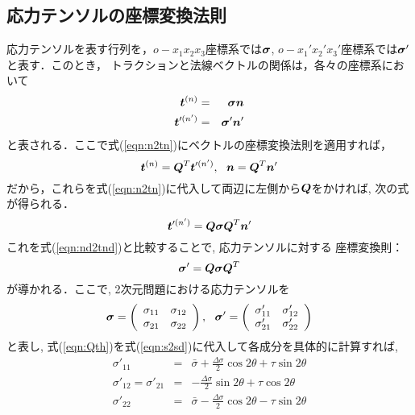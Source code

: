 \documentclass[10pt,a4j]{jbook}
\begin{document}
\subsection{応力テンソルの座標変換法則}
応力テンソルを表す行列を，$o-x_1x_2x_3$座標系では$\mbox{\boldmath $\sigma$}$, 
$o-x_1'x_2'x_3'$座標系では$\mbox{\boldmath $\sigma$}'$と表す．このとき，
トラクションと法線ベクトルの関係は，各々の座標系において
\begin{eqnarray}
	\mbox{\boldmath $t$}^{(n)} &=& \mbox{\boldmath $\sigma$}\mbox{\boldmath $n$} 
		\label{eqn:n2tn} \\
	\mbox{\boldmath $t$}'^{(n')} &=& \mbox{\boldmath $\sigma$}'\mbox{\boldmath $n$}'
		\label{eqn:nd2tnd} 
\end{eqnarray}
と表される．ここで式(\ref{eqn:n2tn})にベクトルの座標変換法則を適用すれば，
\begin{equation}
	\fat{t}^{(n)}=\fat{Q}^T \fat{t}'^{(n')}, \ \ 
	\fat{n} = \fat{Q}^T \fat{n}'
\end{equation}
だから，これらを式(\ref{eqn:n2tn})に代入して両辺に左側から$\mbox{\boldmath $Q$}$をかければ, 
次の式が得られる．
\begin{equation}
	\mbox{\boldmath $t$}'^{(n')}=\mbox{\boldmath $Q$} \mbox{\boldmath $\sigma$} \mbox{\boldmath $Q$}^T \mbox{\boldmath $n$}'
\end{equation}
これを式(\ref{eqn:nd2tnd})と比較することで, 応力テンソルに対する
座標変換則：
\begin{equation}
	\mbox{\boldmath $\sigma$}'=\mbox{\boldmath $Q$}\mbox{\boldmath $\sigma$}\mbox{\boldmath $Q$}^T
	\label{eqn:s2sd}
\end{equation}
が導かれる．ここで, 2次元問題における応力テンソルを
\begin{equation}
	\fat{\sigma}=\left(
		\begin{array}{cc}
		 \sigma_{11} & \sigma_{12} \\
		 \sigma_{21} & \sigma_{22} 
		\end{array}
	\right)
	, \ \ 
	\fat{\sigma}'=\left(
		\begin{array}{cc}
	 \sigma'_{11} & \sigma'_{12} \\
	 \sigma'_{21} & \sigma'_{22} 
	\end{array}
	\right)
\end{equation}
と表し, 式(\ref{eqn:Qth})を式(\ref{eqn:s2sd})に代入して各成分を具体的に計算すれば, 
\begin{eqnarray}
	\sigma'_{11} &=& \bar{\sigma} + \frac{\Delta \sigma}{2} \cos 2\theta + \tau \sin 2\theta
		\label{eqn:s11d} \\
	\sigma'_{12}=\sigma'_{21} &=& - \frac{\Delta \sigma}{2} \sin 2\theta + \tau \cos 2\theta
		\label{eqn:s12d} \\
	\sigma'_{22} &=& \bar{\sigma} - \frac{\Delta \sigma}{2} \cos 2\theta - \tau \sin 2\theta 
		\label{eqn:s22d}
\end{eqnarray}
\end{document}

